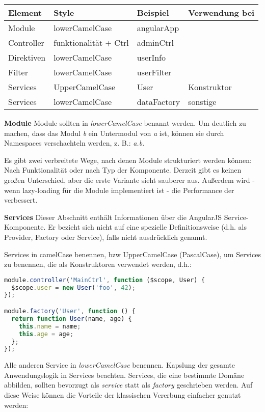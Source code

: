 \begin{tabular}{|l|l|l|l|}
\hline
\textbf{Element} & \textbf{Style} & \textbf{Beispiel} & \textbf{Verwendung bei} \\ \hline
Module & lowerCamelCase & angularApp &  \\ \hline
Controller & funktionalität + Ctrl & adminCtrl &  \\ \hline
Direktiven & lowerCamelCase & userInfo &  \\ \hline
Filter & lowerCamelCase & userFilter &  \\ \hline
Services & UpperCamelCase & User & Konstruktor \\ \hline
Services & lowerCamelCase & dataFactory & sonstige \\ \hline
\end{tabular}

\textbf{Module\newline}
Module sollten in \textit{lowerCamelCase} benannt werden. Um deutlich zu machen, dass das Modul \textit{b} ein Untermodul von \textit{a} ist, können sie durch Namespaces verschachteln werden, z. B.: \textit{a.b}.

Es gibt zwei verbreitete Wege, nach denen Module strukturiert werden können: Nach Funktionalität
oder nach Typ der Komponente. Derzeit gibt es keinen großen Unterschied, aber die erste Variante sieht sauberer aus. Außerdem wird - wenn lazy-loading für die Module implementiert ist - die Performance der verbessert.

\textbf{Services\newline}
Dieser Abschnitt enthält Informationen über die AngularJS Service-Komponente. Er bezieht sich nicht auf eine spezielle Definitionsweise (d.h. als Provider, Factory oder Service), falls nicht ausdrücklich genannt.

Services in camelCase benennen, bzw UpperCamelCase (PascalCase), um Services zu benennen, die als Konstruktoren verwendet werden, d.h.:

\begin{lstlisting}[language=JavaScript]
module.controller('MainCtrl', function ($scope, User) {
  $scope.user = new User('foo', 42);
});

module.factory('User', function () {
  return function User(name, age) {
    this.name = name;
    this.age = age;
  };
});
\end{lstlisting}

Alle anderen Service in \textit{lowerCamelCase} benennen. Kapslung der gesamte Anwendungslogik in Services beachten. Services, die eine bestimmte Domäne abbilden, sollten bevorzugt als \textit{service} statt als \textit{factory} geschrieben werden. Auf diese Weise können die Vorteile der klassischen Vererbung einfacher genutzt werden:


